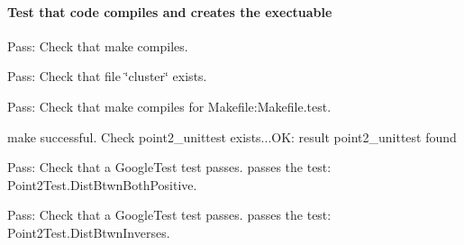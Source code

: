 \paragraph*{Test that code compiles and creates the exectuable}


\begin{DoxyItemize}
\item Pass\+: Check that make compiles.
\item Pass\+: Check that file \char`\"{}cluster\char`\"{} exists.
\item Pass\+: Check that make compiles for Makefile\+:Makefile.\+test.

make successful. Check point2\+\_\+unittest exists...OK\+: result point2\+\_\+unittest found
\item Pass\+: Check that a Google\+Test test passes. passes the test\+: Point2\+Test.\+Dist\+Btwn\+Both\+Positive.
\item Pass\+: Check that a Google\+Test test passes. passes the test\+: Point2\+Test.\+Dist\+Btwn\+Inverses. 
\end{DoxyItemize}
